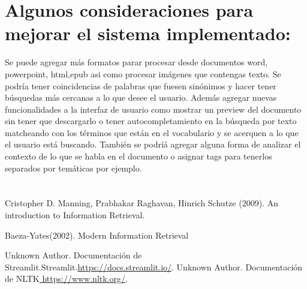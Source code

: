 \documentclass{llncs}
\begin{document}
\chapter*{Algunos consideraciones para mejorar el sistema implementado:}
Se puede agregar más formatos parar procesar desde documentos word, powerpoint,
html,epub  asi como procesar imágenes que contengas texto. Se podría tener coincidencias 
de palabras  que fuesen sinónimos y hacer tener búsquedas más cercanas a lo que desee el usuario.
Además agregar nuevas funcionalidades a la interfaz de usuario como mostrar un preview del documento 
sin tener que descargarlo o tener autocompletamiento en la búsqueda por texto matcheando con los 
términos que están en el vocabulario y se acerquen a lo que el usuario está buscando. También se 
podríá agregar alguna forma de analizar el contexto de lo que se habla en el documento o asignar 
tags para tenerlos separados por temáticas por ejemplo.
\newpage

\chapter*{}
\begin{thebibliography}{}
    Cristopher D. Manning, Prabhakar Raghavan, Hinrich Schutze (2009).
    An introduction to Information Retrieval.
    
    Baeza-Yates(2002).
    Modern Information Retrieval 

   
    Unknown Author.
    Documentación de Streamlit.Streamlit.\url{https://docs.streamlit.io/}.
    Unknown Author.
    Documentación de NLTK\url{ https://www.nltk.org/}.
    
\end{thebibliography}
\end{document}
